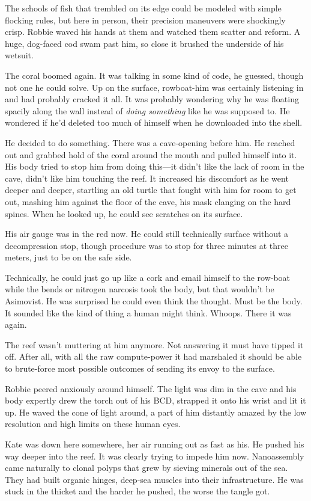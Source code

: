 The schools of fish that trembled on its edge could be modeled with
simple flocking rules, but here in person, their precision
maneuvers were shockingly crisp. Robbie waved his hands at them and
watched them scatter and reform. A huge, dog-faced cod swam past
him, so close it brushed the underside of his wetsuit.

The coral boomed again. It was talking in some kind of code, he
guessed, though not one he could solve. Up on the surface,
rowboat-him was certainly listening in and had probably cracked it
all. It was probably wondering why he was floating spacily along
the wall instead of \emph{doing something} like he was supposed to.
He wondered if he’d deleted too much of himself when he downloaded
into the shell.

He decided to do something. There was a cave-opening before him. He
reached out and grabbed hold of the coral around the mouth and
pulled himself into it. His body tried to stop him from doing
this—it didn’t like the lack of room in the cave, didn’t like him
touching the reef. It increased his discomfort as he went deeper
and deeper, startling an old turtle that fought with him for room
to get out, mashing him against the floor of the cave, his mask
clanging on the hard spines. When he looked up, he could see
scratches on its surface.

His air gauge was in the red now. He could still technically
surface without a decompression stop, though procedure was to stop
for three minutes at three meters, just to be on the safe side.

Technically, he could just go up like a cork and email himself to
the row-boat while the bends or nitrogen narcosis took the body,
but that wouldn’t be Asimovist. He was surprised he could even
think the thought. Must be the body. It sounded like the kind of
thing a human might think. Whoops. There it was again.

The reef wasn’t muttering at him anymore. Not answering it must
have tipped it off. After all, with all the raw compute-power it
had marshaled it should be able to brute-force most possible
outcomes of sending its envoy to the surface.

Robbie peered anxiously around himself. The light was dim in the
cave and his body expertly drew the torch out of his BCD, strapped
it onto his wrist and lit it up. He waved the cone of light around,
a part of him distantly amazed by the low resolution and high
limits on these human eyes.

Kate was down here somewhere, her air running out as fast as his.
He pushed his way deeper into the reef. It was clearly trying to
impede him now. Nanoassembly came naturally to clonal polyps that
grew by sieving minerals out of the sea. They had built organic
hinges, deep-sea muscles into their infrastructure. He was stuck in
the thicket and the harder he pushed, the worse the tangle got.

